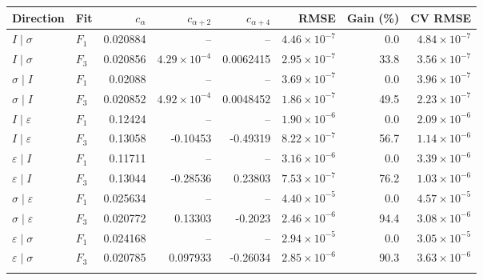 \begin{tabular}{llrrrrrr}\toprule
Direction & Fit & $c_{\alpha}$ & $c_{\alpha+2}$ & $c_{\alpha+4}$ & RMSE & Gain (\%) & CV RMSE\\\midrule
$I\mid \sigma$ & $F_1$ & 0.020884 & -- & -- & $4.46\!\times\!10^{-7}$ & 0.0 & $4.84\!\times\!10^{-7}$ \\
$I\mid \sigma$ & $F_3$ & 0.020856 & $4.29\!\times\!10^{-4}$ & 0.0062415 & $2.95\!\times\!10^{-7}$ & 33.8 & $3.56\!\times\!10^{-7}$ \\
\addlinespace[2pt]
$\sigma\mid I$ & $F_1$ & 0.02088 & -- & -- & $3.69\!\times\!10^{-7}$ & 0.0 & $3.96\!\times\!10^{-7}$ \\
$\sigma\mid I$ & $F_3$ & 0.020852 & $4.92\!\times\!10^{-4}$ & 0.0048452 & $1.86\!\times\!10^{-7}$ & 49.5 & $2.23\!\times\!10^{-7}$ \\
\addlinespace[2pt]
$I\mid \varepsilon$ & $F_1$ & 0.12424 & -- & -- & $1.90\!\times\!10^{-6}$ & 0.0 & $2.09\!\times\!10^{-6}$ \\
$I\mid \varepsilon$ & $F_3$ & 0.13058 & -0.10453 & -0.49319 & $8.22\!\times\!10^{-7}$ & 56.7 & $1.14\!\times\!10^{-6}$ \\
\addlinespace[2pt]
$\varepsilon\mid I$ & $F_1$ & 0.11711 & -- & -- & $3.16\!\times\!10^{-6}$ & 0.0 & $3.39\!\times\!10^{-6}$ \\
$\varepsilon\mid I$ & $F_3$ & 0.13044 & -0.28536 & 0.23803 & $7.53\!\times\!10^{-7}$ & 76.2 & $1.03\!\times\!10^{-6}$ \\
\addlinespace[2pt]
$\sigma\mid \varepsilon$ & $F_1$ & 0.025634 & -- & -- & $4.40\!\times\!10^{-5}$ & 0.0 & $4.57\!\times\!10^{-5}$ \\
$\sigma\mid \varepsilon$ & $F_3$ & 0.020772 & 0.13303 & -0.2023 & $2.46\!\times\!10^{-6}$ & 94.4 & $3.08\!\times\!10^{-6}$ \\
\addlinespace[2pt]
$\varepsilon\mid \sigma$ & $F_1$ & 0.024168 & -- & -- & $2.94\!\times\!10^{-5}$ & 0.0 & $3.05\!\times\!10^{-5}$ \\
$\varepsilon\mid \sigma$ & $F_3$ & 0.020785 & 0.097933 & -0.26034 & $2.85\!\times\!10^{-6}$ & 90.3 & $3.63\!\times\!10^{-6}$ \\
\addlinespace[2pt]
\bottomrule\end{tabular}
